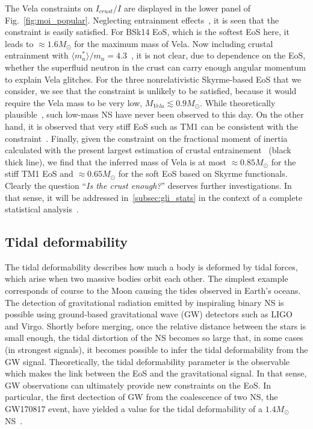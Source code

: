 The Vela constraints on $I_{crust}/I$ are displayed in the lower panel of 
Fig.~\ref{fig:moi_popular}. Neglecting entrainment effects~\cite{Link1999}, it
is seen that the constraint is easily satisfied. For BSk14 EoS, which is the
softest EoS here, it leads to $\approx 1.6M_\odot$ for the maximum mass of 
Vela. Now including crustal entrainment with $\langle m_n^*\rangle/m_n =
4.3$~\cite{Andersson2012}, it is not clear, due to dependence on the EoS, 
whether the superfluid neutron in the crust can carry enough angular momentum 
to explain Vela glitches. For the three nonrelativistic Skyrme-based EoS that 
we consider, we see that the constraint is unlikely to be satisfied, because it
would require the Vela mass to be very low, $M_{Vela} \lesssim 0.9M_\odot$.
While theoretically plausible~\cite{Haensel2007}, such low-mass NS have never 
been observed to this day. On the other hand, it is observed that very stiff 
EoS such as TM1 can be consistent with the constraint~\cite{Piekarewicz2014}.
Finally, given the constraint on the fractional moment of inertia calculated 
with the present largest estimation of crustal entrainement~\cite{Delsate2016}
(black thick line), we find that the inferred mass of Vela is at most 
$\approx 0.85M_\odot$ for the stiff TM1 EoS and $\approx 0.65M_\odot$ for the 
soft EoS based on Skyrme functionals. Clearly the question 
``\textit{Is the crust enough?}'' deserves further investigations. In that 
sense, it will be addressed in~\ref{subsec:gli_stats} in the context of a 
complete statistical analysis~\cite{Carreau2019moi}.

\subsection{Tidal deformability}\label{subsec:tidal} %

The tidal deformability describes how much a body is deformed by tidal forces,
which arise when two massive bodies orbit each other. The simplest example
corresponds of course to the Moon causing the tides observed in Earth's 
oceans.
The detection of gravitational radiation emitted by inspiraling binary NS 
is possible using ground-based gravitational wave (GW) detectors such as LIGO 
and Virgo. 
Shortly before merging, once the relative distance between the stars is small
enough, the tidal distortion of the NS becomes so large that, in some cases (in
strongest signals), it becomes possible to infer the tidal deformability from 
the GW signal. Theoretically, the tidal deformability parameter is the 
observable which makes the link between the EoS and the gravitational signal. 
In that sense, GW observations can ultimately provide new constraints on the 
EoS. In particular, the first dectection of GW from the coalescence of two NS, 
the GW170817 event, have yielded a value for the tidal deformability of a 
$1.4M_\odot$ NS~\cite{GW1}.

